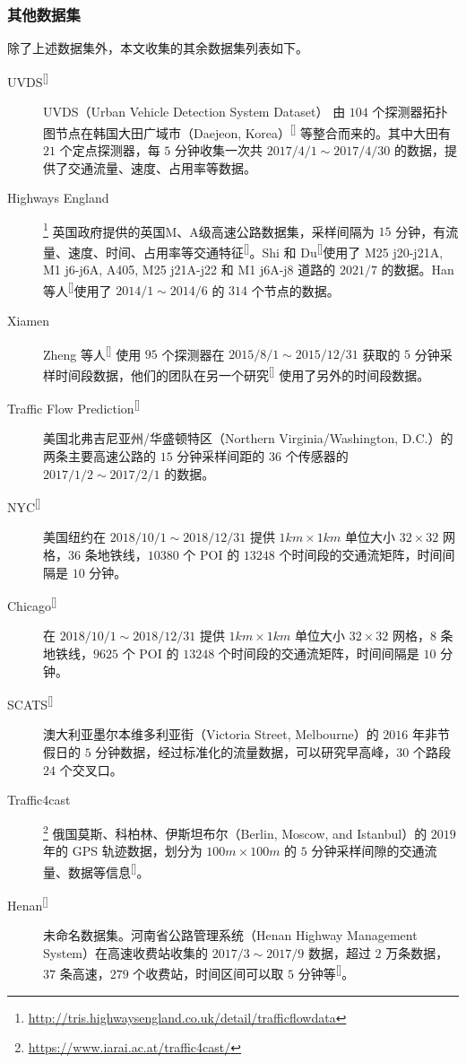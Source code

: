 \documentclass{ctexart}
\renewcommand{\cite}[1]{\textsuperscript{[\citenum{#1}]}}
\begin{document}
\subsubsection{其他数据集}

除了上述数据集外，本文收集的其余数据集列表如下。

\begin{description}
    \item[UVDS\cite{T-370}] UVDS（Urban Vehicle Detection System Dataset） 由 $104$ 个探测器拓扑图节点在韩国大田广域市（Daejeon, Korea）\cite{T-369} 等整合而来的。其中大田有 $21$ 个定点探测器，每 $5$ 分钟收集一次共 $2017/4/1\sim2017/4/30$ 的数据，提供了交通流量、速度、占用率等数据。
    \item[Highways England]\footnote{\url{http://tris.highwaysengland.co.uk/detail/trafficflowdata}} 英国政府提供的英国M、A级高速公路数据集，采样间隔为 $15$ 分钟，有流量、速度、时间、占用率等交通特征\cite{T-ZS35}。Shi 和 Du\cite{T-186}使用了 M25 j20-j21A, M1 j6-j6A, A405, M25 j21A-j22 和 M1 j6A-j8 道路的 $2021/7$ 的数据。Han 等人\cite{T-300}使用了 $2014/1\sim2014/6$ 的 $314$ 个节点的数据。
    \item[Xiamen] Zheng 等人\cite{T-143} 使用 $95$ 个探测器在 $2015/8/1\sim2015/12/31$ 获取的 $5$ 分钟采样时间段数据，他们的团队在另一个研究\cite{T-177} 使用了另外的时间段数据。
    \item[Traffic Flow Prediction\cite{T-152}] 美国北弗吉尼亚州/华盛顿特区（Northern Virginia/Washington, D.C.）的两条主要高速公路的 $15$ 分钟采样间距的 $36$ 个传感器的 $2017/1/2\sim2017/2/1$ 的数据。
    \item[NYC\cite{T-196}] 美国纽约在 $2018/10/1\sim2018/12/31$ 提供 $1km\times1km$ 单位大小 $32\times32$ 网格，$36$ 条地铁线，$10380$ 个 POI 的 $13248$ 个时间段的交通流矩阵，时间间隔是 $10$ 分钟。
    \item[Chicago\cite{T-196}] 在 $2018/10/1\sim2018/12/31$ 提供 $1km\times1km$ 单位大小 $32\times32$ 网格，$8$ 条地铁线，$9625$ 个 POI 的 $13248$ 个时间段的交通流矩阵，时间间隔是 $10$ 分钟。
    \item[SCATS\cite{T-44}] 澳大利亚墨尔本维多利亚街（Victoria Street, Melbourne）的 $2016$ 年非节假日的 $5$ 分钟数据，经过标准化的流量数据，可以研究早高峰，$30$ 个路段 $24$ 个交叉口。
    \item[Traffic4cast]\footnote{\url{https://www.iarai.ac.at/traffic4cast/}} 俄国莫斯、科柏林、伊斯坦布尔（Berlin, Moscow, and Istanbul）的 $2019$ 年的 GPS 轨迹数据，划分为 $100m\times100m$ 的 $5$ 分钟采样间隙的交通流量、数据等信息\cite{T-206}。
    \item[Henan\cite{T-223}] 未命名数据集。河南省公路管理系统（Henan Highway Management System）在高速收费站收集的 $2017/3\sim2017/9$ 数据，超过 $2$ 万条数据，$37$ 条高速，$279$ 个收费站，时间区间可以取 $5$ 分钟等\cite{T-372}。
\end{description}
\end{document}
